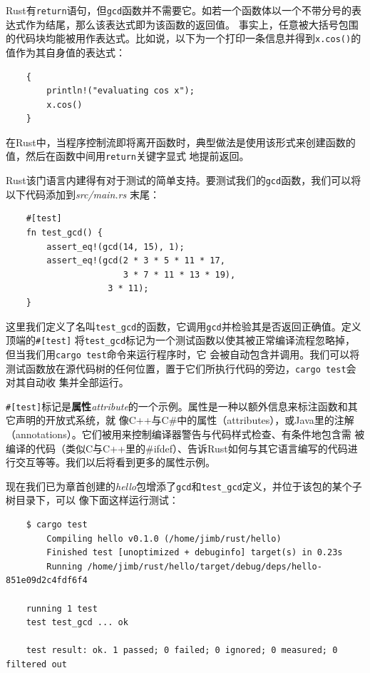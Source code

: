 Rust有\texttt{return}语句，但\texttt{gcd}函数并不需要它。如若一个函数体以一个不带分号的表达式作为结尾，那么该表达式即为该函数的返回值。
事实上，任意被大括号包围的代码块均能被用作表达式。比如说，以下为一个打印一条信息并得到\texttt{x.cos()}的值作为其自身值的表达式：
\begin{verbatim}
    {
        println!("evaluating cos x");
        x.cos()
    }
\end{verbatim}

在Rust中，当程序控制流即将离开函数时，典型做法是使用该形式来创建函数的值，然后在函数中间用\texttt{return}关键字显式
地提前返回。

\bigskip
{}
Rust该门语言内建得有对于测试的简单支持。要测试我们的\texttt{gcd}函数，我们可以将以下代码添加到\textit{src/main.rs}
末尾：
\begin{verbatim}
    #[test]
    fn test_gcd() {
        assert_eq!(gcd(14, 15), 1);
        assert_eq!(gcd(2 * 3 * 5 * 11 * 17, 
                       3 * 7 * 11 * 13 * 19),
                    3 * 11);
    }
\end{verbatim}

\smallskip
这里我们定义了名叫\texttt{test\_gcd}的函数，它调用\texttt{gcd}并检验其是否返回正确值。定义顶端的\texttt{\#[test]}
将\texttt{test\_gcd}标记为一个测试函数以使其被正常编译流程忽略掉，但当我们用\texttt{cargo test}命令来运行程序时，它
会被自动包含并调用。我们可以将测试函数放在源代码树的任何位置，置于它们所执行代码的旁边，\texttt{cargo test}会对其自动收
集并全部运行。

\medskip
\texttt{\#[test]}标记是\textbf{属性}\textit{attribute}的一个示例。属性是一种以额外信息来标注函数和其它声明的开放式系统，就
像C++与C\#中的属性（attributes），或Java里的注解（annotations）。它们被用来控制编译器警告与代码样式检查、有条件地包含需
被编译的代码（类似C与C++里的\#ifdef）、告诉Rust如何与其它语言编写的代码进行交互等等。我们以后将看到更多的属性示例。

\medskip
现在我们已为章首创建的\textit{hello}包增添了\texttt{gcd}和\texttt{test\_gcd}定义，并位于该包的某个子树目录下，可以
像下面这样运行测试：
\begin{verbatim}
    $ cargo test
        Compiling hello v0.1.0 (/home/jimb/rust/hello)
        Finished test [unoptimized + debuginfo] target(s) in 0.23s
        Running /home/jimb/rust/hello/target/debug/deps/hello-851e09d2c4fdf6f4

    running 1 test
    test test_gcd ... ok

    test result: ok. 1 passed; 0 failed; 0 ignored; 0 measured; 0 filtered out
\end{verbatim}

